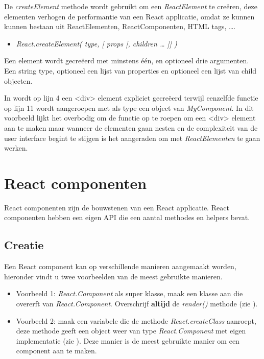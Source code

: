 		De \emph{createElement} methode wordt gebruikt om een \emph{ReactElement} te creëren, deze elementen verhogen de performantie van een React applicatie, omdat ze kunnen kunnen bestaan uit ReactElementen, ReactComponenten, HTML tags, \ldots.
		
		\begin{itemize}
			\item[] \emph{React.createElement( type, [ props [, children … ]] )}
		\end{itemize}
		
		Een element wordt gecreëerd met minstens één, en optioneel drie argumenten. Een string type, optioneel een lijst van properties en optioneel een lijst van child objecten.
		
		
		In  wordt op lijn 4 een <div> element expliciet gecreëerd terwijl eenzelfde functie op lijn 11 wordt aangeroepen met als type een object van \emph{MyComponent}. In dit voorbeeld lijkt het overbodig om de functie op te roepen om een <div> element aan te maken maar wanneer de elementen gaan nesten en de complexiteit van de user interface begint te stijgen is het aangeraden om met \emph{ReactElementen} te gaan werken.
	
\section{React componenten}
	
	React componenten zijn de bouwstenen van een React applicatie. React componenten hebben een eigen API die een aantal methodes en helpers bevat.
	
	\subsection{Creatie}
		
		Een React component kan op verschillende manieren aangemaakt worden, hieronder vindt u twee voorbeelden van de meest gebruikte manieren.
		
		\begin{itemize}
			\item Voorbeeld 1: \emph{React.Component} als super klasse, maak een klasse aan die overerft van \emph{React.Component}. Overschrijf \textbf{altijd} de \emph{render()} methode (zie ).
			\item Voorbeeld 2: maak een variabele die de methode \emph{React.createClass} aanroept, deze methode geeft een object weer van type \emph{React.Component} met eigen implementatie (zie ). Deze manier is de meest gebruikte manier om een component aan te maken.
		\end{itemize}
	
